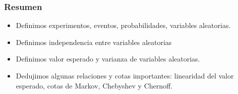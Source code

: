 \documentclass[english, spanish, fleqn,%
hyperref = {colorlinks, urlcolor = blue}%
]{beamer}
\begin{document}
\begin{frame}
  \setcounter{beamerpauses}{2}
  \frametitle{Resumen}

  \begin{itemize}
  \item
    Definimos experimentos,
    eventos,
    probabilidades,
    variables aleatorias.
  \item
    Definimos independencia entre variables aleatorias
  \item
    Definimos valor esperado y varianza de variables aleatorias.
  \item
    Dedujimos algunas relaciones y cotas importantes:
    linearidad del valor esperado,
    cotas de Markov,
    Chebyshev y Chernoff.
  \end{itemize}
\end{frame}
\end{document}
